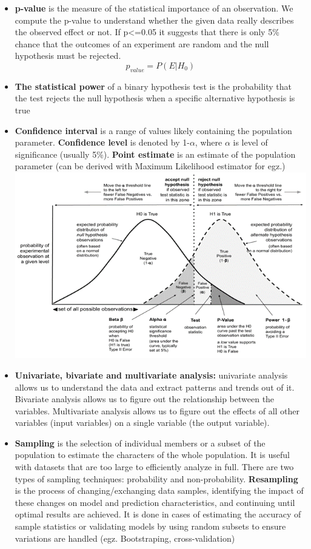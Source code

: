 \documentclass[
  letterpaper,
]{book}
\begin{document}
\begin{itemize}
\item
  \textbf{p-value} is the measure of the statistical importance of an
  observation. We compute the p-value to understand whether the given
  data really describes the observed effect or not. If p\textless=0.05
  it suggests that there is only 5\% chance that the outcomes of an
  experiment are random and the null hypothesis must be rejected.
  \[ p_{value} = P(E|H_{0}) \]
\item
  \textbf{The statistical power} of a binary hypothesis test is the
  probability that the test rejects the null hypothesis when a specific
  alternative hypothesis is true
\item
  \textbf{Confidence interval} is a range of values likely containing
  the population parameter. \textbf{Confidence level} is denoted by
  1-\(\alpha\), where \(\alpha\) is level of significance (usually 5\%).
  \textbf{Point estimate} is an estimate of the population parameter
  (can be derived with Maximum Likelihood estimator for egz.)
  \includegraphics{Picture7.png}
\item
  \textbf{Univariate, bivariate and multivariate analysis:} univariate
  analysis allows us to understand the data and extract patterns and
  trends out of it. Bivariate analysis allows us to figure out the
  relationship between the variables. Multivariate analysis allows us to
  figure out the effects of all other variables (input variables) on a
  single variable (the output variable).
\item
  \textbf{Sampling} is the selection of individual members or a subset
  of the population to estimate the characters of the whole population.
  It is useful with datasets that are too large to efficiently analyze
  in full. There are two types of sampling techniques: probability and
  non-probability. \textbf{Resampling} is the process of
  changing/exchanging data samples, identifying the impact of these
  changes on model and prediction characteristics, and continuing until
  optimal results are achieved. It is done in cases of estimating the
  accuracy of sample statistics or validating models by using random
  subsets to ensure variations are handled (egz. Bootstraping,
  cross-validation)


\end{itemize}
\end{document}
